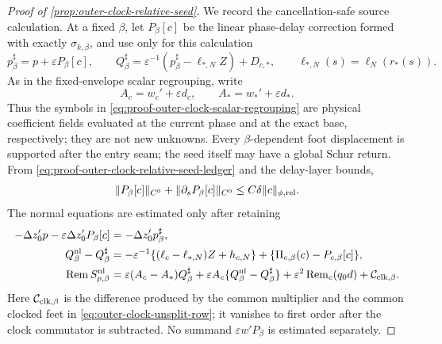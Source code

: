 \begin{proof}[Proof of \cref{prop:outer-clock-relative-seed}]
We record the cancellation-safe source calculation.  At a fixed
\(\beta\), let \(P_\beta[c]\) be the linear phase-delay correction formed
with exactly \(\sigma_{k,\beta}\), and use only for this calculation
\begin{equation}
 p_\beta^\sharp=p+\varepsilon P_\beta[c],\qquad
 Q_\beta^\sharp
 =\varepsilon^{-1}(p_\beta^\sharp-\ell_{*,N}Z)+D_{c,*},
 \qquad \ell_{*,N}(s)=\ell_N(r_*(s)).             \label{eq:proof-outer-clock-fixed-beta-shift}
\end{equation}
As in the fixed-envelope scalar regrouping, write
\begin{equation}
 A_c=w_c'+\varepsilon d_c,\qquad
 A_*=w_*'+\varepsilon d_*.                       \label{eq:proof-outer-clock-A-coefficients}
\end{equation}
Thus the symbols in
\cref{eq:proof-outer-clock-scalar-regrouping} are physical coefficient
fields evaluated at the current phase and at the exact base,
respectively; they are not new unknowns.
Every \(\beta\)-dependent foot displacement is supported after the entry
seam; the seed itself may have a global Schur return.  From
\cref{eq:proof-outer-clock-relative-seed-ledger} and the delay-layer
bounds,
\begin{equation}
 \|P_\beta[c]\|_{C^0}
 +\|\partial_sP_\beta[c]\|_{C^0}
 \le C\delta\|c\|_{\phi,\rm rel}.                \label{eq:proof-outer-clock-fixed-beta-P}
\end{equation}
The normal equations are estimated only after retaining
\begin{align}
 -\Delta z_0'p-\varepsilon\Delta z_0'P_\beta[c]
 &=-\Delta z_0'p_\beta^\sharp,\notag\\
 Q_\beta^{\rm nl}-Q_\beta^\sharp
 &=-\varepsilon^{-1}
   \{(\ell_c-\ell_{*,N})Z+h_{c,N}\}
       +\{\Pi_{c,\beta}(c)-P_{c,\beta}[c]\},     \label{eq:proof-outer-clock-speed-regrouping}\\
 \operatorname{Rem}S_{p,\beta}^{\rm nl}
 &=
 \varepsilon(A_c-A_*)Q_\beta^\sharp
 +\varepsilon A_c\{Q_\beta^{\rm nl}-Q_\beta^\sharp\}
 +\varepsilon^2\operatorname{Rem}_{c}(q_0d)
 +\mathcal C_{\rm clk,\beta}.                   \label{eq:proof-outer-clock-scalar-regrouping}
\end{align}
Here \(\mathcal C_{\rm clk,\beta}\) is the difference produced by the
common multiplier and the common clocked feet in
\cref{eq:outer-clock-unsplit-row}; it vanishes to first order after the
clock commutator is subtracted.  No summand
\(\varepsilon w'P_\beta\) is estimated separately.


\end{proof}

